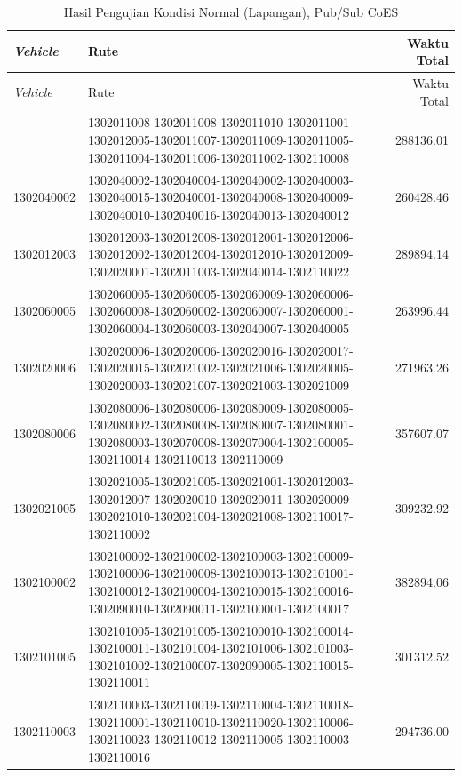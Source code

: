 \begin{longtable}[!]{lp{8cm}r}
	\caption{Hasil Pengujian Kondisi Normal (Lapangan), Pub/Sub CoES}
	\label{tbl:test_result_normal_field_pubsub_coes}\\
	\toprule
		\textit{Vehicle} & Rute & Waktu Total\\ 
	\midrule
	\endfirsthead
	\toprule
		\textit{Vehicle} & Rute & Waktu Total\\ 
	\midrule
	\endhead
	\bottomrule
	\endfoot
		1302011008 & 1302011008-1302011008-1302011010-1302011001-1302012005-1302011007-1302011009-1302011005-1302011004-1302011006-1302011002-1302110008 & 288136.01 \\
		1302040002 & 1302040002-1302040004-1302040002-1302040003-1302040015-1302040001-1302040008-1302040009-1302040010-1302040016-1302040013-1302040012 & 260428.46 \\
		1302012003 & 1302012003-1302012008-1302012001-1302012006-1302012002-1302012004-1302012010-1302012009-1302020001-1302011003-1302040014-1302110022 & 289894.14 \\
		1302060005 & 1302060005-1302060005-1302060009-1302060006-1302060008-1302060002-1302060007-1302060001-1302060004-1302060003-1302040007-1302040005 & 263996.44 \\
		1302020006 & 1302020006-1302020006-1302020016-1302020017-1302020015-1302021002-1302021006-1302020005-1302020003-1302021007-1302021003-1302021009 & 271963.26 \\
		1302080006 & 1302080006-1302080006-1302080009-1302080005-1302080002-1302080008-1302080007-1302080001-1302080003-1302070008-1302070004-1302100005-1302110014-1302110013-1302110009 & 357607.07 \\
		1302021005 & 1302021005-1302021005-1302021001-1302012003-1302012007-1302020010-1302020011-1302020009-1302021010-1302021004-1302021008-1302110017-1302110002 & 309232.92 \\
		1302100002 & 1302100002-1302100002-1302100003-1302100009-1302100006-1302100008-1302100013-1302101001-1302100012-1302100004-1302100015-1302100016-1302090010-1302090011-1302100001-1302100017 & 382894.06 \\
		1302101005 & 1302101005-1302101005-1302100010-1302100014-1302100011-1302101004-1302101006-1302101003-1302101002-1302100007-1302090005-1302110015-1302110011 & 301312.52 \\
		1302110003 & 1302110003-1302110019-1302110004-1302110018-1302110001-1302110010-1302110020-1302110006-1302110023-1302110012-1302110005-1302110003-1302110016 & 294736.00 \\

\end{longtable}
